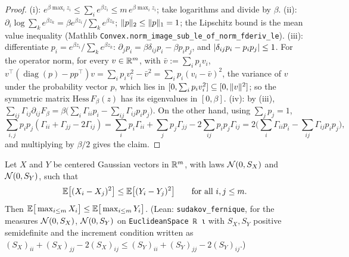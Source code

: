 \begin{proof}
\leanok
(i): $e^{\beta\max_i z_i} \le \sum_i e^{\beta z_i} \le m\,e^{\beta\max_i z_i}$; take logarithms
and divide by $\beta$. (ii): $\partial_i\log\sum_ke^{\beta z_k} = \beta e^{\beta z_i}/\sum_ke^{\beta z_k}$;
$\lVert p \rVert_2 \le \lVert p \rVert_1 = 1$; the Lipschitz bound is the mean value inequality
(Mathlib \texttt{Convex.norm\_image\_sub\_le\_of\_norm\_fderiv\_le}). (iii): differentiate
$p_i = e^{\beta z_i}/\sum_k e^{\beta z_k}$: $\partial_jp_i = \beta\delta_{ij}p_i - \beta p_ip_j$,
and $\lvert \delta_{ij}p_i - p_ip_j \rvert\le 1$. For the operator norm, for every $v\in\mathbb{R}^m$, with
$\bar v := \sum_ip_iv_i$,
$v^\top(\operatorname{diag}(p) - pp^\top)v = \sum_ip_iv_i^2 - \bar v^2 = \sum_ip_i(v_i-\bar v)^2$,
the variance of $v$ under the probability vector $p$, which lies in
$[0, \sum_ip_iv_i^2]\subseteq[0,\lVert v \rVert^2]$; so the symmetric matrix
$\mathrm{Hess}\,F_\beta(z)$ has its eigenvalues in $[0,\beta]$. (iv): by (iii),
$\sum_{ij}\Gamma_{ij}\partial_{ij}F_\beta = \beta\big(\sum_i\Gamma_{ii}p_i - \sum_{ij}\Gamma_{ij}p_ip_j\big)$.
On the other hand, using $\sum_jp_j = 1$,
\[
  \sum_{i,j}p_ip_j(\Gamma_{ii}+\Gamma_{jj}-2\Gamma_{ij})
  = \sum_ip_i\Gamma_{ii} + \sum_jp_j\Gamma_{jj} - 2\sum_{ij}p_ip_j\Gamma_{ij}
  = 2\Big(\sum_i\Gamma_{ii}p_i - \sum_{ij}\Gamma_{ij}p_ip_j\Big),
\]
and multiplying by $\beta/2$ gives the claim.
\end{proof}

\begin{theorem}\label{thm:sudakov_fernique}
\leanok
{}
Let $X$ and $Y$ be centered Gaussian vectors in $\mathbb{R}^m$, with laws $\mathcal{N}(0,S_X)$ and
$\mathcal{N}(0,S_Y)$, such that
\[
  \mathbb{E}\big[(X_i - X_j)^2\big] \le \mathbb{E}\big[(Y_i - Y_j)^2\big] \qquad\text{for all } i,j\le m .
\]
Then $\mathbb{E}\big[\max_{i\le m}X_i\big] \le \mathbb{E}\big[\max_{i\le m}Y_i\big]$.
(Lean: \texttt{sudakov\_fernique}, for the measures $\mathcal{N}(0,S_X)$, $\mathcal{N}(0,S_Y)$ on
\texttt{EuclideanSpace ℝ ι} with $S_X, S_Y$ positive semidefinite and the increment condition
written as $(S_X)_{ii} + (S_X)_{jj} - 2(S_X)_{ij} \le (S_Y)_{ii} + (S_Y)_{jj} - 2(S_Y)_{ij}$.)
\end{theorem}

